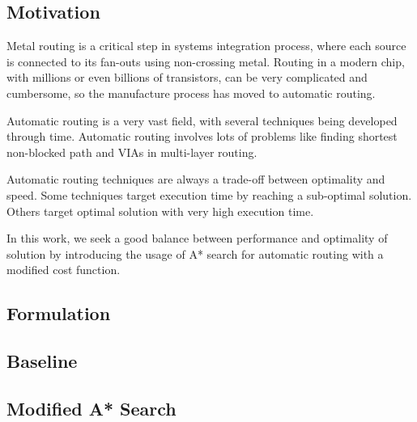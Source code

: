 \subsection{Motivation}
Metal routing is a critical step in systems integration process, where each source is connected to its fan-outs using non-crossing metal. Routing in a modern chip, with millions or even billions of transistors, can be very complicated and cumbersome, so the manufacture process has moved to automatic routing. 

Automatic routing is a very vast field, with several techniques being developed through time. Automatic routing involves lots of problems like finding shortest non-blocked path and VIAs in multi-layer routing. 

Automatic routing techniques are always a trade-off between optimality and speed. Some techniques target execution time by reaching a sub-optimal solution. Others target optimal solution with very high execution time.

In this work, we seek a good balance between performance and optimality of solution by introducing the usage of A* search for automatic routing with a modified cost function.

\subsection{Formulation}

\subsection{Baseline}

\subsection{Modified A* Search}